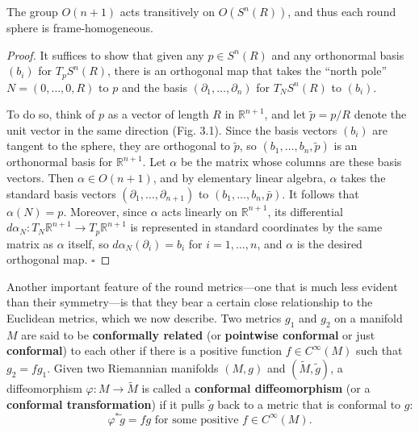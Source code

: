 
\begin{proposition}
\label{prop:frame-homogeneous-sphere}
The group $O(n + 1)$ acts transitively on $O(S^n(R))$, and thus each round sphere is frame-homogeneous.
\end{proposition}

\begin{proof}
It suffices to show that given any $p \in S^n(R)$ and any orthonormal basis $(b_i)$ for $T_pS^n(R)$, there is an orthogonal map that takes the ``north pole'' $N = (0,\ldots,0,R)$ to $p$ and the basis $(\partial_1,\ldots,\partial_n)$ for $T_NS^n(R)$ to $(b_i)$.

To do so, think of $p$ as a vector of length $R$ in $\mathbb{R}^{n+1}$, and let $\tilde{p} = p/R$ denote the unit vector in the same direction (Fig. 3.1). Since the basis vectors $(b_i)$ are tangent to the sphere, they are orthogonal to $\tilde{p}$, so $(b_1,\ldots,b_n,\tilde{p})$ is an orthonormal basis for $\mathbb{R}^{n+1}$. Let $\alpha$ be the matrix whose columns are these basis vectors. Then $\alpha \in O(n+1)$, and by elementary linear algebra, $\alpha$ takes the standard basis vectors $(\partial_1, \ldots, \partial_{n+1})$ to $(b_1, \ldots, b_n, \bar{p})$. It follows that $\alpha(N) = p$. Moreover, since $\alpha$ acts linearly on $\mathbb{R}^{n+1}$, its differential $d\alpha_N : T_N \mathbb{R}^{n+1} \to T_p \mathbb{R}^{n+1}$ is represented in standard coordinates by the same matrix as $\alpha$ itself, so $d\alpha_N(\partial_i) = b_i$ for $i = 1, \ldots, n$, and $\alpha$ is the desired orthogonal map. $\square$
\end{proof}

Another important feature of the round metrics---one that is much less evident than their symmetry---is that they bear a certain close relationship to the Euclidean metrics, which we now describe. Two metrics $g_1$ and $g_2$ on a manifold $M$ are said to be \textbf{conformally related} (or \textbf{pointwise conformal} or just \textbf{conformal}) to each other if there is a positive function $f \in C^{\infty}(M)$ such that $g_2 = f g_1$. Given two Riemannian manifolds $(M, g)$ and $(\tilde{M}, \tilde{g})$, a diffeomorphism $\varphi : M \to \tilde{M}$ is called a \textbf{conformal diffeomorphism} (or a \textbf{conformal transformation}) if it pulls $\tilde{g}$ back to a metric that is conformal to $g$:
\[
\varphi^* \tilde{g} = f g \text{ for some positive } f \in C^{\infty}(M).
\]

